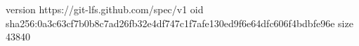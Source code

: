 version https://git-lfs.github.com/spec/v1
oid sha256:0a3c63cf7b0b8c7ad26fb32e4df747c1f7afe130ed9f6e64dfc606f4bdbfe96e
size 43840

